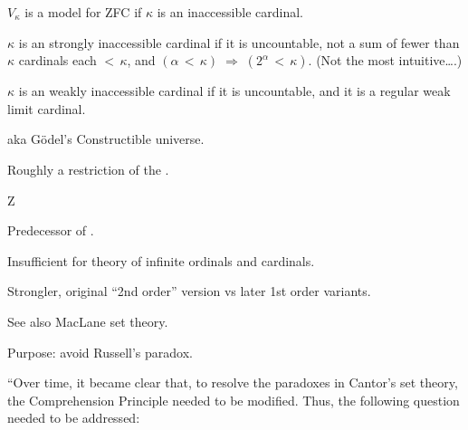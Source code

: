 $V_{\kappa}$ is a model for \textsf{ZFC} 
if $\kappa$ is an inaccessible cardinal\cite{wiki:InaccessibleCardinal}.

$\kappa$ is an strongly inaccessible cardinal 
if it is uncountable, 
not a sum of fewer than $\kappa$ cardinals each $<\,\kappa$,
and
$(\alpha \,<\, \kappa) \;\Rightarrow\; (2^{\alpha}\,<\,\kappa)$.
(Not the most intuitive\ldots .)

$\kappa$ is an weakly inaccessible cardinal 
if it is uncountable,
and
it is a regular weak limit 
cardinal\cite{wiki:RegularCardinal,wiki:LimitCardinal}.

\label{sec:Constructible_universe}

aka G\"{o}del's Constructible 
universe\cite{wiki:ConstructibleUniverse}.

Roughly a restriction of the . 

\label{sec:Zermelo_set_theory}

\textsf{Z}\cite{wiki:ZermeloSetTheory}

Predecessor of .

Insufficient for theory of infinite 
ordinals\cite{wiki:OrdinalNumber}
and cardinals.

Strongler, original ``2nd order'' version 
vs  later 1st order variants.

See also MacLane set theory\cite{Maclane:1986:MathFormFunction}.
\label{sec:Zermelo-Fraenkel-set-theory}

Purpose: avoid Russell's paradox\cite{wiki:RussellParadox}.

``Over time, it became clear that, to resolve the 
paradoxes in Cantor’s set theory, the Comprehension Principle 
needed to be modified. Thus, the following question needed to 
be addressed:

